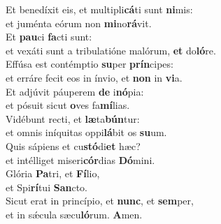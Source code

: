 \evenverse Et benedíxit eis, et multipli\textbf{cá}ti sunt \textbf{ni}mis:~\*\\
\evenverse et juménta eórum non \textbf{mi}no\textbf{rá}vit.\\
\oddverse Et \textbf{pau}ci \textbf{fa}cti sunt:~\*\\
\oddverse et vexáti sunt a tribulatióne malórum, \textbf{et} do\textbf{ló}re.\\
\evenverse Effúsa est contémptio \textbf{su}per \textbf{prín}cipes:~\*\\
\evenverse et erráre fecit eos in ínvio, et \textbf{non} in \textbf{vi}a.\\
\oddverse Et adjúvit páuperem \textbf{de} i\textbf{nó}pia:~\*\\
\oddverse et pósuit sicut \textbf{o}ves fa\textbf{mí}lias.\\
\evenverse Vidébunt recti, et \textbf{læ}ta\textbf{bún}tur:~\*\\
\evenverse et omnis iníquitas oppi\textbf{lá}bit os \textbf{su}um.\\
\oddverse Quis sápiens et cu\textbf{stó}di\textbf{et} hæc?~\*\\
\oddverse et intélliget miseri\textbf{cór}dias \textbf{Dó}mini.\\
\evenverse Glória \textbf{Pa}tri, et \textbf{Fí}lio,~\*\\
\evenverse et Spi\textbf{rí}tui \textbf{San}cto.\\
\oddverse Sicut erat in princípio, et \textbf{nunc}, et \textbf{sem}per,~\*\\
\oddverse et in sǽcula sæcu\textbf{ló}rum. \textbf{A}men.\\
